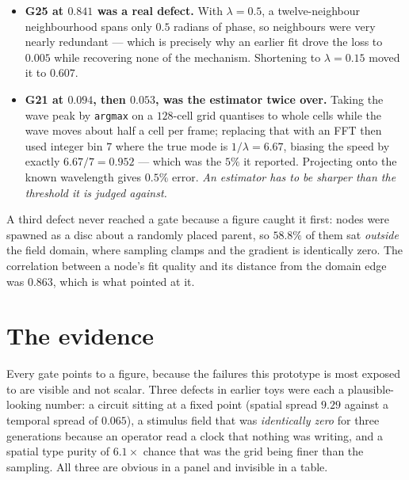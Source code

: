 \documentclass[11pt,a4paper]{article}
\newcommand{\code}[1]{\texttt{\small #1}}
\begin{document}
\begin{itemize}[leftmargin=1.3em,itemsep=4pt]
\item \textbf{G25 at $0.841$ was a real defect.} With $\lambda = 0.5$, a twelve-neighbour
neighbourhood spans only $0.5$ radians of phase, so neighbours were very nearly redundant --- which
is precisely why an earlier fit drove the loss to $0.005$ while recovering none of the mechanism.
Shortening to $\lambda = 0.15$ moved it to $0.607$.
\item \textbf{G21 at $0.094$, then $0.053$, was the estimator twice over.} Taking the wave peak by
\code{argmax} on a $128$-cell grid quantises to whole cells while the wave moves about half a cell
per frame; replacing that with an FFT then used integer bin $7$ where the true mode is
$1/\lambda = 6.67$, biasing the speed by exactly $6.67/7 = 0.952$ --- which was the $5\%$ it
reported. Projecting onto the known wavelength gives $0.5\%$ error. \emph{An estimator has to be
sharper than the threshold it is judged against.}
\end{itemize}

\noindent
A third defect never reached a gate because a figure caught it first: nodes were spawned as a disc
about a randomly placed parent, so $58.8\%$ of them sat \emph{outside} the field domain, where
sampling clamps and the gradient is identically zero. The correlation between a node's fit quality
and its distance from the domain edge was $0.863$, which is what pointed at it.

\section{The evidence}

Every gate points to a figure, because the failures this prototype is most exposed to are visible
and not scalar. Three defects in earlier toys were each a plausible-looking number: a circuit
sitting at a fixed point (spatial spread $9.29$ against a temporal spread of $0.065$), a stimulus
field that was \emph{identically zero} for three generations because an operator read a clock that
nothing was writing, and a spatial type purity of $6.1\times$ chance that was the grid being finer
than the sampling. All three are obvious in a panel and invisible in a table.

\gateFigures
\end{document}
